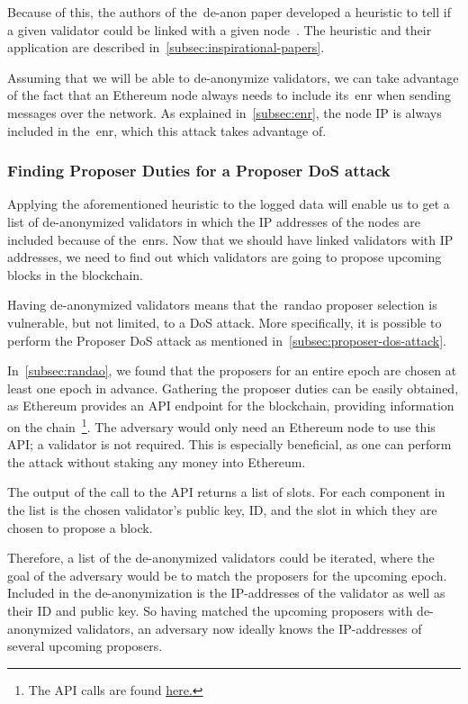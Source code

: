 Because of this,
the authors of the~\gls{de-anon paper} developed a heuristic to tell if a given validator could be linked with a given node~\cite{heimbach2024deanonymizingethereumvalidatorsp2p}.
The heuristic and their application are described in~\autoref{subsec:inspirational-papers}.

Assuming that we will be able to de-anonymize validators, we can take advantage of the fact that an Ethereum node always needs to include its~\gls{enr} when sending messages over the network.
As explained in~\autoref{subsec:enr}, the node IP is always included in the~\gls{enr}, which this attack takes advantage of.

\subsubsection{Finding Proposer Duties for a Proposer DoS attack}
Applying the aforementioned heuristic to the logged data will enable us to get a list of de-anonymized validators in which the IP addresses of the nodes are included because of the~\glspl{enr}.
Now that we should have linked validators with IP addresses, we need to find out which validators are going to propose upcoming blocks in the blockchain.

Having de-anonymized validators means that the~\gls{randao} proposer selection is vulnerable,
but not limited, to a DoS attack.
More specifically,
it is possible to perform the Proposer DoS attack as mentioned in~\autoref{subsec:proposer-dos-attack}.

In~\autoref{subsec:randao}, we found that the proposers for an entire epoch are chosen at least one epoch in advance.
Gathering the proposer duties can be easily obtained, as Ethereum provides an API endpoint for the blockchain,
providing information on the chain~\footnote{The API calls are found \href{https://ethereum.github.io/beacon-APIs/\#/Validator/getProposerDuties}{here.}}.
The adversary would only need an Ethereum node to use this API; a validator is not required.
This is especially beneficial, as one can perform the attack without staking any money into Ethereum.

The output of the call to the API returns a list of slots.
For each component in the list is the chosen validator's public key,
ID, and the slot in which they are chosen to propose a block.

Therefore, a list of the de-anonymized validators could be iterated,
where the goal of the adversary would be to match the proposers for the upcoming epoch.
Included in the de-anonymization is the IP-addresses of the validator as well as their ID and public key.
So having matched the upcoming proposers with de-anonymized validators,
an adversary now ideally knows the IP-addresses of several upcoming proposers.

